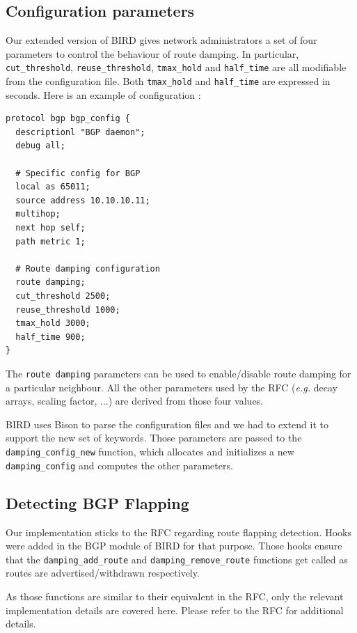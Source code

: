 \documentclass[a4paper,english]{IEEEtran}
\begin{document}
\subsection{Configuration parameters}

Our extended version of BIRD gives network administrators a set of four parameters to control the behaviour of route damping.
In particular, {\tt\small cut\_threshold}, {\tt\small reuse\_threshold}, {\tt\small tmax\_hold} and {\tt\small half\_time} are all modifiable
from the configuration file.
Both {\tt\small tmax\_hold} and {\tt\small half\_time} are expressed in seconds.
Here is an example of configuration :

\begin{verbatim}
protocol bgp bgp_config {
  descriptionl "BGP daemon";
  debug all;

  # Specific config for BGP
  local as 65011;
  source address 10.10.10.11;
  multihop;
  next hop self;
  path metric 1;
 
  # Route damping configuration
  route damping;
  cut_threshold 2500;
  reuse_threshold 1000;
  tmax_hold 3000;
  half_time 900;
}
\end{verbatim}

The {\tt\small route damping} parameters can be used to enable/disable route damping for a particular neighbour.
All the other parameters used by the RFC (\textit{e.g.} decay arrays, scaling factor, ...) are derived from
those four values.

BIRD uses Bison to parse the configuration files and we had to extend it to support the new set of keywords.
Those parameters are passed to the {\tt\small damping\_config\_new} function, which allocates and initializes a new {\tt\small damping\_config} and computes the 
other parameters.

\subsection{Detecting BGP Flapping}

Our implementation sticks to the RFC regarding route flapping detection.
Hooks were added in the BGP module of BIRD for that purpose.
Those hooks ensure that the {\tt\small damping\_add\_route} and {\tt\small damping\_remove\_route} functions get
called as routes are advertised/withdrawn respectively.

As those functions are similar to their equivalent in the RFC, only the relevant implementation details are covered here.
Please refer to the RFC for additional details.
\end{document}
